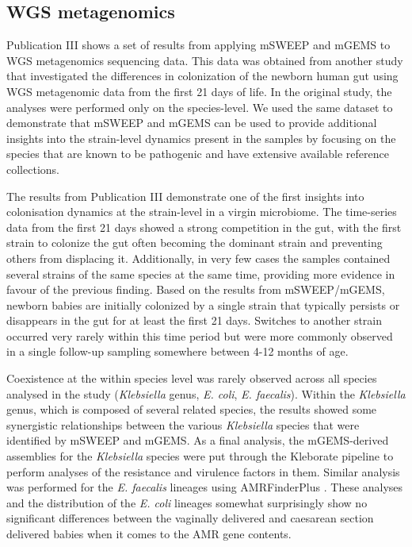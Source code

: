 \documentclass[officiallayout]{tktla}
\begin{document}
\subsection{WGS metagenomics}

Publication III shows a set of results from applying mSWEEP and mGEMS
to WGS metagenomics sequencing data. This data was obtained from
another study \citep{shao2019stunted} that investigated the differences in
colonization of the newborn human gut using WGS metagenomic data from
the first 21 days of life. In the original study, the analyses were
performed only on the species-level. We used the same dataset to
demonstrate that mSWEEP and mGEMS can be used to provide additional
insights into the strain-level dynamics present in the samples by
focusing on the species that are known to be pathogenic and have
extensive available reference collections.

The results from Publication III demonstrate one of the first insights into
colonisation dynamics at the strain-level in a virgin microbiome. The
time-series data from the first 21 days showed a strong competition in
the gut, with the first strain to colonize the gut often becoming the
dominant strain and preventing others from displacing
it. Additionally, in very few cases the samples contained several
strains of the same species at the same time, providing more
evidence in favour of the previous finding. Based on the results from
mSWEEP/mGEMS, newborn babies are initially colonized by a single
strain that typically persists or disappears in the gut for at least
the first 21 days. Switches to another strain occurred very rarely
within this time period but were more commonly observed in a single
follow-up sampling somewhere between 4-12 months of age.

Coexistence at the within species level was rarely observed across all
species analysed in the study (\textit{Klebsiella} genus,
\textit{E. coli}, \textit{E. faecalis}). Within the
\textit{Klebsiella} genus, which is composed of several related
species, the results showed some synergistic relationships between the
various \textit{Klebsiella} species that were identified by mSWEEP and
mGEMS. As a final analysis, the mGEMS-derived assemblies for the
\textit{Klebsiella} species were put through the Kleborate
\citep{lam2021genomic} pipeline to perform analyses of the resistance
and virulence factors in them. Similar analysis was performed for the
\textit{E. faecalis} lineages using AMRFinderPlus
\citep{feldgarden2021amrfinderplus}. These analyses and the
distribution of the \textit{E. coli} lineages somewhat surprisingly
show no significant differences between the vaginally delivered and
caesarean section delivered babies when it comes to the AMR gene
contents.
\end{document}
